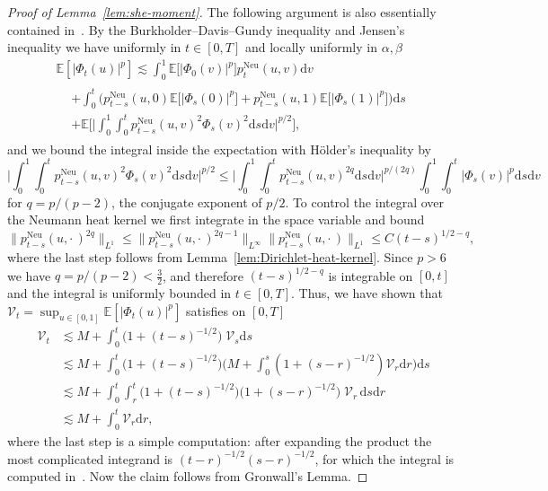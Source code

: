 \documentclass[AHL,Unicode,longabstracts]{cedram}
\DeclareMathOperator{\Neu}{Neu}
\newcommand{\bb}[1]{{\mathbb #1}}
\newcommand{\mc}[1]{{\mathcal #1}}
\renewcommand{\mc}[1]{{\mathcal #1}}
\renewcommand{\leq}{\leqslant}
\renewcommand{\le}{\leqslant}
\newcommand*{\dd}{\mathrm{d}}
\newcommand*{\dr}{\dd r}
\newcommand*{\ds}{\dd s}
\newcommand*{\dv}{\dd v}
\begin{document}
\begin{proof}[Proof of Lemma~\ref{lem:she-moment}]
The following argument is also essentially contained in~\cite[Theorem~3.2]{Walsh1986}. By the Burkholder--Davis--Gundy inequality and Jensen's inequality we have uniformly in $t \in [0,T]$ and locally uniformly in $\alpha,\beta$
\begin{multline*}
\bb E[|\Phi_t(u)|^p] \lesssim \int_0^1 \bb E\big[|\Phi_0(v)|^p\big] p^{\Neu}_t(u,v) \dv\\
\begin{aligned}
&+ \int_0^t \big(p^{\Neu}_{t-s}(u,0) \bb E\big[|\Phi_s(0)|^p\big] + p^{\Neu}_{t-s}(u,1) \bb E\big[|\Phi_s(1)|^p\big]\big) \ds \\
&+ \bb E \bigg[\Big| \int_0^1 \int_0^t p^{\Neu}_{t-s}(u,v)^2 \Phi_s(v)^2 \ds \dv \Big|^{p/2} \bigg],
\end{aligned}
\end{multline*}
and we bound the integral inside the expectation with H\"older's inequality by
\begin{equation*}
\Big| \int_0^1 \!\int_0^t p^{\Neu}_{t-s}(u,v)^2 \Phi_s(v)^2 \ds \dv \Big|^{p/2} \le \Big| \int_0^1\! \int_0^t p^{\Neu}_{t-s}(u,v)^{2 q} \ds \dv \Big|^{p/(2q)} \int_0^1 \!\int_0^t |\Phi_s(v)|^p \ds \dv
\end{equation*}
for $q = p /(p-2)$, the conjugate exponent of $p/2$. To control the integral over the Neumann heat kernel we first integrate in the space variable and bound
\[
\big\| p^{\Neu}_{t-s}(u,\cdot\,)^{2q}\big\|_{L^1} \le \big\| p^{\Neu}_{t-s}(u,\cdot\,)^{2q-1}\big\|_{L^\infty} \big\| p^{\Neu}_{t-s}(u,\cdot\,)\big\|_{L^1} \leq C (t-s)^{1/2-q},
\]
where the last step follows from Lemma~\ref{lem:Dirichlet-heat-kernel}. Since $p>6$ we have $q = p/(p-2) < \frac32$, and therefore $(t-s)^{1/2-q}$ is integrable on $[0,t]$ and the integral is uniformly bounded in $t \in [0,T]$. Thus, we have shown that $\mc V_t = \sup_{u \in [0,1]} \bb E[|\Phi_t(u)|^p]$ satisfies on $[0,T]$
\begin{align*}
\mc V_t & \lesssim M + \int_0^t \big(1 + (t-s)^{-1/2}\big)\; \mc V_s \ds \\
& \lesssim M + \int_0^t \big(1 + (t-s)^{-1/2}\big) \bigg(M + \int_0^s (1 + (s-r)^{-1/2}) \mc V_r \dr \bigg) \ds \\
& \lesssim M + \int_0^t \int_r^t \big(1 + (t-s)^{-1/2}\big)\big(1 + (s-r)^{-1/2}\big)\; \mc V_r \,\ds \dr \\
& \lesssim M + \int_0^t \mc V_r \dr,
\end{align*}
where the last step is a simple computation: after expanding the product the most complicated integrand is $(t-r)^{-1/2}(s-r)^{-1/2}$, for which the integral is computed in~\cite[p.~315]{Walsh1986}. Now the claim follows from Gronwall's Lemma.
\end{proof}
\end{document}
